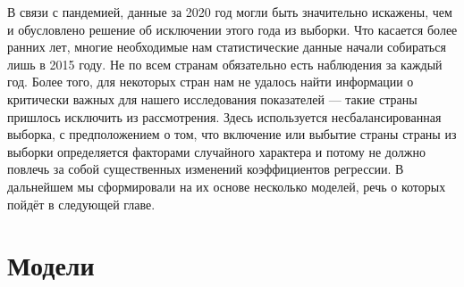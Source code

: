 \documentclass[russian]{vegareport}
\begin{document}
        В связи с пандемией, данные за 2020 год могли быть значительно искажены, чем и обусловлено решение об исключении этого года из выборки. Что касается более ранних лет, многие необходимые нам статистические данные начали собираться лишь в 2015 году. Не по всем странам обязательно есть наблюдения за каждый год. Более того, для некоторых стран нам не удалось найти информации о критически важных для нашего исследования показателей --- такие страны пришлось исключить из рассмотрения. Здесь используется несбалансированная выборка, с предположением о том, что включение или выбытие страны страны из выборки определяется факторами случайного характера и потому не должно повлечь за собой существенных изменений коэффициентов регрессии. В дальнейшем мы сформировали на их основе несколько моделей, речь о которых пойдёт в следующей главе.

    \chapter{Модели}
\end{document}
